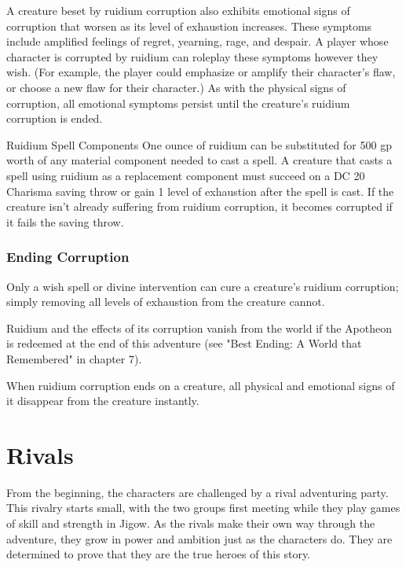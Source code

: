 \documentclass[10pt,a4paper,twoside,twocolumn,openany,nodeprecatedcode]{dndbook}
\begin{document}
A creature beset by ruidium corruption also exhibits emotional signs of corruption that worsen as its level of exhaustion increases. These symptoms include amplified feelings of regret, yearning, rage, and despair. A player whose character is corrupted by ruidium can roleplay these symptoms however they wish. (For example, the player could emphasize or amplify their character's flaw, or choose a new flaw for their character.) As with the physical signs of corruption, all emotional symptoms persist until the creature's ruidium corruption is ended.

\begin{DndSidebar}[float=!b]{Ruidium Spell Components}
One ounce of ruidium can be substituted for 500 gp worth of any material component needed to cast a spell. A creature that casts a spell using ruidium as a replacement component must succeed on a DC 20 Charisma saving throw or gain 1 level of exhaustion after the spell is cast. If the creature isn't already suffering from ruidium corruption, it becomes corrupted if it fails the saving throw.



\end{DndSidebar}

\subsubsection{Ending Corruption}
Only a wish spell or divine intervention can cure a creature's ruidium corruption; simply removing all levels of exhaustion from the creature cannot.

Ruidium and the effects of its corruption vanish from the world if the Apotheon is redeemed at the end of this adventure (see "Best Ending: A World that Remembered" in chapter 7).

When ruidium corruption ends on a creature, all physical and emotional signs of it disappear from the creature instantly.

\section{Rivals}
From the beginning, the characters are challenged by a rival adventuring party. This rivalry starts small, with the two groups first meeting while they play games of skill and strength in Jigow. As the rivals make their own way through the adventure, they grow in power and ambition just as the characters do. They are determined to prove that they are the true heroes of this story.
\end{document}
